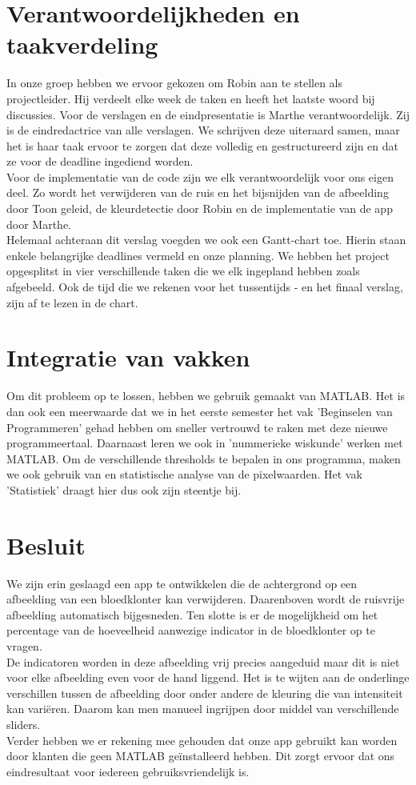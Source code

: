 \documentclass[a4paper,kulak]{kulakarticle}
\begin{document}
\section{Verantwoordelijkheden en taakverdeling}		
In onze groep hebben we ervoor gekozen om Robin aan te stellen als projectleider. Hij verdeelt elke week de taken en heeft het laatste woord bij discussies. 
Voor de verslagen en de eindpresentatie is Marthe verantwoordelijk. Zij is de eindredactrice van alle verslagen. We schrijven deze uiteraard samen, maar het is haar taak ervoor te zorgen dat deze volledig en gestructureerd zijn en dat ze voor de deadline ingediend worden.\\
Voor de implementatie van de code zijn we elk verantwoordelijk voor ons eigen deel. Zo wordt het verwijderen van de ruis en het bijsnijden van de afbeelding door Toon geleid, de kleurdetectie door Robin en de implementatie van de app door Marthe.\\
Helemaal achteraan dit verslag voegden we ook een Gantt-chart toe. Hierin staan enkele belangrijke deadlines vermeld en onze planning. We hebben het project opgesplitst in vier verschillende taken die we elk ingepland hebben zoals afgebeeld. Ook de tijd die we rekenen voor het tussentijds - en het finaal verslag, zijn af te lezen in de chart.

\section{Integratie van vakken}
Om dit probleem op te lossen, hebben we gebruik gemaakt van MATLAB. Het is dan ook een meerwaarde dat we in het eerste semester het vak 'Beginselen van Programmeren' gehad hebben om sneller vertrouwd te raken met deze nieuwe programmeertaal. Daarnaast leren we ook in 'nummerieke wiskunde' werken met MATLAB. Om de verschillende thresholds te bepalen in ons programma, maken we ook gebruik van en statistische analyse van de pixelwaarden. Het vak 'Statistiek' draagt hier dus ook zijn steentje bij.

\section{Besluit}	
We zijn erin geslaagd een app te ontwikkelen die de achtergrond op een afbeelding van een bloedklonter kan verwijderen. Daarenboven wordt de ruisvrije afbeelding automatisch bijgesneden. Ten slotte is er de mogelijkheid om het percentage van de hoeveelheid aanwezige indicator in de bloedklonter op te vragen.\\ 
De indicatoren worden in deze afbeelding vrij precies aangeduid maar dit is niet voor elke afbeelding even voor de hand liggend. Het is te wijten aan de onderlinge verschillen tussen de afbeelding door onder andere de kleuring die van intensiteit kan variëren. Daarom kan men manueel ingrijpen door middel van verschillende sliders. \\ 
Verder hebben we er rekening mee gehouden dat onze app gebruikt kan worden door klanten die geen MATLAB geïnstalleerd hebben. Dit zorgt ervoor dat ons eindresultaat voor iedereen gebruiksvriendelijk is.

\newpage




\end{document}
